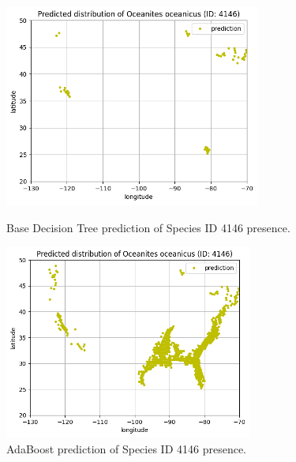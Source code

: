 \documentclass{article}
\begin{document}
\begin{figure}[H]
    \begin{minipage}{0.3\textwidth}
        \includegraphics[width=\textwidth]{figures/decision_tree.png}
        \caption{Base Decision Tree prediction of Species ID 4146 presence.}
        \label{fig:pred1}
    \end{minipage}\hfill
    \begin{minipage}{0.3\textwidth}
        \includegraphics[width=\textwidth]{figures/adaboost.png}
        \caption{AdaBoost prediction of Species ID 4146 presence.}
        \label{fig:pred2}
    \end{minipage}\hfill

\end{figure}
\end{document}
